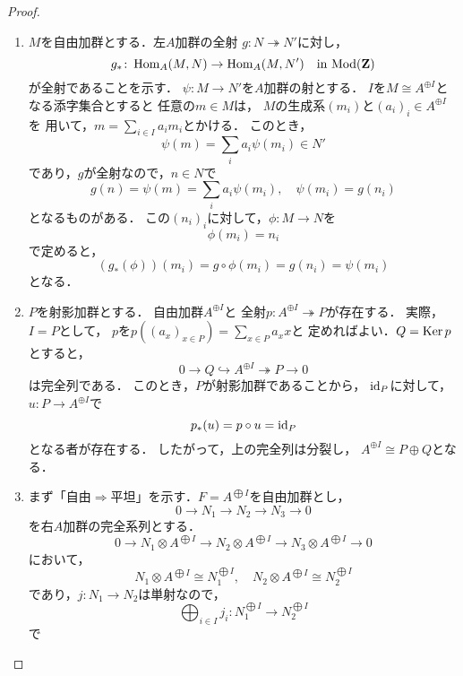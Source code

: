\begin{proof}
    \begin{enumerate}
        \item \(M\)を自由加群とする．左\(A\)加群の全射
        \(g\colon N\twoheadrightarrow N'\)に対し，\[
            g_\ast\colon\mathop{\mathrm{Hom}}\nolimits_A(M,N)\to\mathop{\mathrm{Hom}}\nolimits_A(M,N') 
            \quad\text{in \(\mathop{\mathrm{Mod}}\nolimits(\mathbf{Z})\)}
        \]が全射であることを示す．
        \(\psi\colon M\to N'\)を\(A\)加群の射とする．
        \(I\)を\(M\cong A^{\oplus I}\)となる添字集合とすると
        任意の\(m\in M\)は，
        \(M\)の生成系\((m_i)\)と\((a_i)_i\in A^{\oplus I}\)を
        用いて，\(m=\sum_{i\in I}a_im_i\)とかける．
        このとき，\[
            \psi(m)=\sum_{i}a_i\psi(m_i)\in N'
        \]であり，\(g\)が全射なので，\(n\in N\)で\[
            g(n)=\psi(m)=\sum_{i}a_i\psi(m_i),
            \quad
            \psi(m_i)=g(n_i)
        \]となるものがある．
        この\((n_i)_i\)に対して，\(\phi\colon M\to N\)を
        \[
            \phi(m_i)=n_i
        \]で定めると，
        \[
            \left(g_\ast(\phi)\right)(m_i)=g\circ\phi(m_i)=g(n_i)=\psi(m_i)
        \]となる．
        \item \(P\)を射影加群とする．
        自由加群\(A^{\oplus I}\)と
        全射\(p\colon A^{\oplus I}\twoheadrightarrow P\)が存在する．
        実際，\(I= P\)として，
        \(p\)を\(p((a_x)_{x\in P})=\sum_{x\in P}a_xx\)と
        定めればよい．\(Q=\mathop{\mathrm{Ker}}\nolimits p\)とすると，\[
            0\to Q\hookrightarrow A^{\oplus I}\twoheadrightarrow P\to0
        \]は完全列である．
        このとき，\(P\)が射影加群であることから，
        \(\mathop{\mathrm{id}}\nolimits_P\)に対して，\(u\colon P\to A^{\oplus I}\)で
        \[p_\ast(u)=p\circ u=\mathop{\mathrm{id}}\nolimits_P\]となる者が存在する．
        したがって，上の完全列は分裂し，
        \(A^{\oplus I}\cong P\oplus Q\)となる．
        \item まず「自由\(\Rightarrow\)平坦」を示す．\(F=A^{\bigoplus I}\)を自由加群とし，\[
            0\to N_1\to N_2\to N_3\to0
        \]を右\(A\)加群の完全系列とする．\[
            0\to N_1\otimes A^{\bigoplus I}\to N_2\otimes A^{\bigoplus I}\to N_3\otimes A^{\bigoplus I}\to0
        \]において，\[
            N_1\otimes A^{\bigoplus I}\cong N_1^{\bigoplus I},\quad
            N_2\otimes A^{\bigoplus I}\cong N_2^{\bigoplus I}
        \]であり，\(j\colon N_1\to N_2\)は単射なので，\[
            \bigoplus_{i\in I}j_i\colon N_1^{\bigoplus I}\to N_2^{\bigoplus I}
        \]で
    \end{enumerate}
\end{proof}

\clearpage
